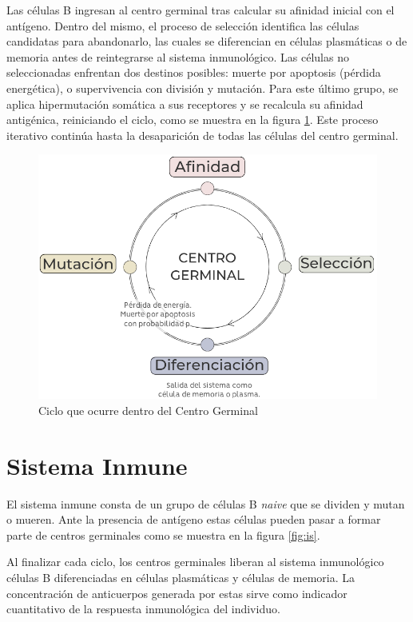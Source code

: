 Las células B ingresan al centro germinal tras calcular su afinidad inicial con el antígeno. Dentro del mismo, el proceso de selección identifica las células candidatas para abandonarlo, las cuales se diferencian en células plasmáticas o de memoria antes de reintegrarse al sistema inmunológico. Las células no seleccionadas enfrentan dos destinos posibles: muerte por apoptosis (pérdida energética), o supervivencia con división y mutación. Para este último grupo, se aplica hipermutación somática a sus receptores y se recalcula su afinidad antigénica, reiniciando el ciclo, como se muestra en la figura \ref{fig:cg}. Este proceso iterativo continúa hasta la desaparición de todas las células del centro germinal. 

\begin{figure}[H] %
    \centering
    \includegraphics[width=1\textwidth]{Graphics/gc.png}
    \caption{Ciclo que ocurre dentro del Centro Germinal}
    \label{fig:cg}
\end{figure}

\section{Sistema Inmune}

El sistema inmune consta de un grupo de células B \textit{naive} que se dividen y mutan o mueren. Ante la presencia de antígeno estas células pueden pasar a formar parte de centros germinales como se muestra en la figura \ref{fig:is}. 

Al finalizar cada ciclo, los centros germinales liberan al sistema inmunológico células B diferenciadas en células plasmáticas y células de memoria. La concentración de anticuerpos generada por estas sirve como indicador cuantitativo de la respuesta inmunológica del individuo.

